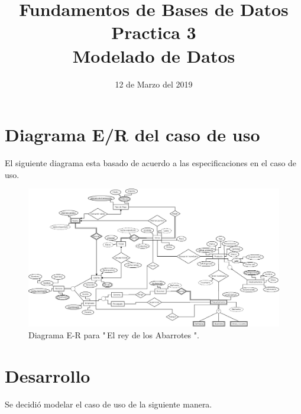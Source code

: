 \documentclass[10pt]{article}
\begin{document}
	\title{Fundamentos de Bases de Datos \\
		Practica 3\\ Modelado de Datos
	} 
	\author{}
	\date{12 de Marzo del 2019}
	\maketitle
	
	\section{Diagrama E/R del caso de uso}
	
	El siguiente diagrama esta basado de acuerdo a las especificaciones en el caso de uso.
	
	\begin{figure}[H]
		\centering
		\includegraphics[width=1 \textwidth]{practica03.jpeg}
		\caption{Diagrama E-R para "\,El rey de los Abarrotes ".}
	\end{figure}
	
	
	\section{Desarrollo}
	Se decidió modelar el caso de uso de la siguiente manera.
\end{document}

